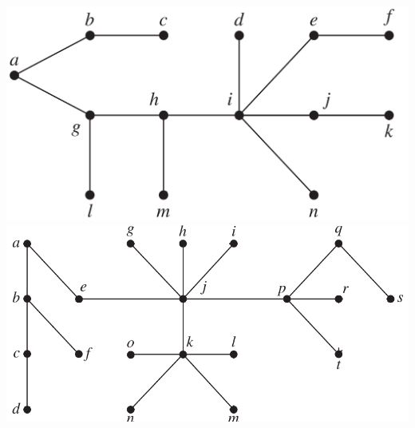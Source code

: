 \begin{itemize}
\includegraphics[scale = 0.25]{img/11_4_14_tree_bfs.png} \vspace{2mm}\\
\includegraphics[scale = 0.5]{img/11_4_15_tree.png} \\

\end{itemize}

